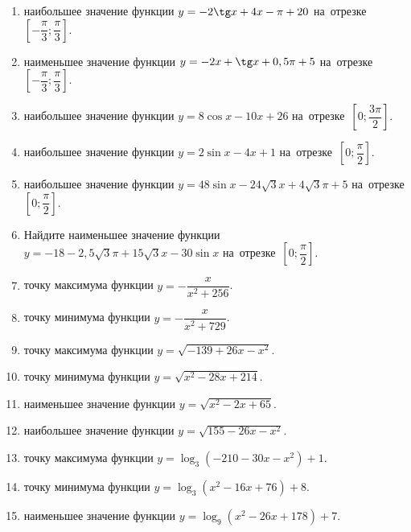 \documentclass[a4paper,10pt]{article}
\begin{document}
\begin{enumerate}
\item {} наибольшее значение функции $y=-2\tg x +4x-\pi +20$ на~отрезке~$\left[-\dfrac{\pi}{3};\dfrac{\pi}{3}\right]$.

\item {} наименьшее значение функции $y=-2x +\tg x+0,5\pi+5$ на~отрезке~$\left[-\dfrac{\pi}{3};\dfrac{\pi}{3}\right]$.

\item {} наибольшее значение функции $y=8\cos x-10x+26$ на~отрезке~$\left[0;\dfrac{3\pi}{2}\right]$.

\item {} наибольшее значение функции $y=2\sin x-4x+1$ на~отрезке~$\left[0;\dfrac{\pi}{2}\right]$.

\item {} наибольшее значение функции $y=48\sin x-24\sqrt{3}x+4\sqrt{3}\pi +5$ на~отрезке~$\left[0;\dfrac{\pi}{2}\right]$.

\item Найдите наименьшее значение функции $y=-18-2,5\sqrt{3}\pi+15\sqrt{3}x-30\sin x$ на~отрезке~$\left[0;\dfrac{\pi}{2}\right]$.

\item {} точку максимума функции $y=-\dfrac{x}{ x^2 +256}$.

\item {} точку минимума функции $y=-\dfrac{x}{ x^2 +729}$.

\item {} точку максимума функции $y=\sqrt{-139+26x-x^2}$.

\item {} точку минимума функции $y=\sqrt{x^2-28x+214}$.

\item {} наименьшее значение функции $y=\sqrt{x^2-2x+65}$.

\item {} наибольшее значение функции $y=\sqrt{155-26x-x^2}$.

\item {} точку максимума функции $y=\log_3\left(-210-30x-x^2\right)+1$.

\item {} точку минимума функции $y=\log_3\left(x^2-16x+76\right)+8$.

\item {} наименьшее значение функции $y=\log_9\left(x^2-26x+178\right)+7$.


\end{enumerate}
\end{document}
